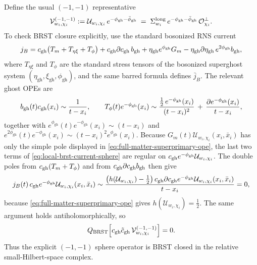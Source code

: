 \documentclass[11pt]{article}
\newcommand{\mc}[1]{\mathcal{#1}}
\newcommand{\gh}{\mathrm{gh}}
\begin{document}
Define the usual $(-1,-1)$ representative
\begin{equation}\label{eq:longitudinal-ns-vertex}
\mc V^{(-1,-1)}_{w_i,\chi_i}
:=
\mc U_{w_i,\chi_i}\,
e^{-\phi_{\gh}-\bar\phi_{\gh}}
\;=\;
\Sigma^{\rm long}_{w_i}\,
e^{-\phi_{\gh}-\bar\phi_{\gh}}\,
\mc O_{\chi_i}^\perp.
\end{equation}
To check BRST closure explicitly, use the standard bosonized RNS current
\begin{equation}\label{eq:local-brst-current-sphere}
j_B
=
c_{\rm gh}\bigl(T_m+T_{\eta\xi}+T_\phi\bigr)
+c_{\rm gh}\partial c_{\rm gh}\,b_{\rm gh}
+\eta_{\gh}e^{\phi_{\gh}}G_m
-\eta_{\gh}\partial\eta_{\gh}\,e^{2\phi_{\gh}}b_{\rm gh},
\end{equation}
where $T_{\eta\xi}$ and $T_\phi$ are the standard stress tensors of the bosonized superghost system $(\eta_{\gh},\xi_{\gh},\phi_{\gh})$, and the same barred formula defines $\bar j_B$. The relevant ghost OPEs are
\[
b_{\rm gh}(t)c_{\rm gh}(x_i)\sim \frac{1}{t-x_i},
\qquad
T_\phi(t)e^{-\phi_{\gh}}(x_i)\sim
\frac{\tfrac12\,e^{-\phi_{\gh}}(x_i)}{(t-x_i)^2}
\,+\,
\frac{\partial e^{-\phi_{\gh}}(x_i)}{t-x_i},
\]
together with $e^{\phi_{\gh}}(t)e^{-\phi_{\gh}}(x_i)\sim (t-x_i)$ and $e^{2\phi_{\gh}}(t)e^{-\phi_{\gh}}(x_i)\sim (t-x_i)^2 e^{\phi_{\gh}}(x_i)$. Because $G_m(t)\mc U_{w_i,\chi_i}(x_i,\bar x_i)$ has only the simple pole displayed in \eqref{eq:full-matter-superprimary-ope}, the last two terms of \eqref{eq:local-brst-current-sphere} are regular on $c_{\rm gh}e^{-\phi_{\gh}}\mc U_{w_i,\chi_i}$. The double poles from $c_{\rm gh}(T_m+T_\phi)$ and from $c_{\rm gh}\partial c_{\rm gh}b_{\rm gh}$ then give
\begin{equation}\label{eq:single-string-brst-class}
j_B(t)\,c_{\rm gh}e^{-\phi_{\gh}}\mc U_{w_i,\chi_i}(x_i,\bar x_i)
\sim
\frac{\bigl(h(\mc U_{w_i,\chi_i})-\tfrac12\bigr)\,
c_{\rm gh}\partial c_{\rm gh}e^{-\phi_{\gh}}\mc U_{w_i,\chi_i}(x_i,\bar x_i)}
{t-x_i}
=0,
\end{equation}
because \eqref{eq:full-matter-superprimary-ope} gives $h(\mc U_{w_i,\chi_i})=\tfrac12$. The same argument holds antiholomorphically, so
\[
Q_{\mathrm{BRST}}
\Bigl[
c_{\rm gh}\tilde c_{\rm gh}\,\mc V^{(-1,-1)}_{w_i,\chi_i}
\Bigr]
=0.
\]
Thus the explicit $(-1,-1)$ sphere operator is BRST closed in the relative small-Hilbert-space complex.
\end{document}
